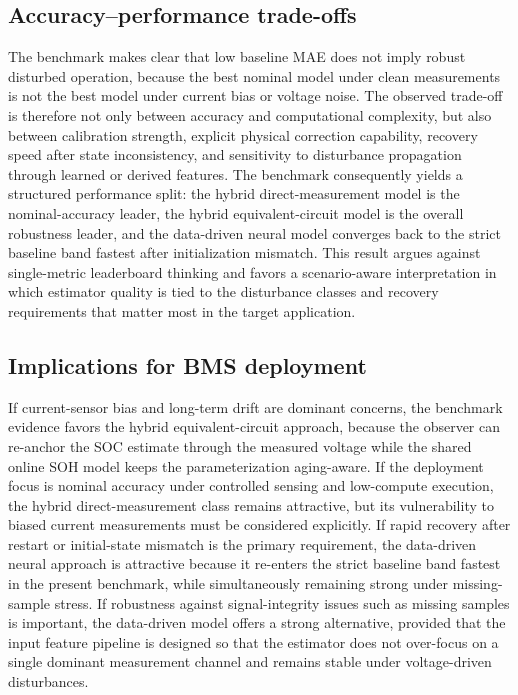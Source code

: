 \documentclass[review,nopreprintline]{elsarticle}
\begin{document}
\subsection{Accuracy--performance trade-offs}
The benchmark makes clear that low baseline MAE does not imply robust disturbed operation, because the best nominal model under clean measurements is not the best model under current bias or voltage noise. The observed trade-off is therefore not only between accuracy and computational complexity, but also between calibration strength, explicit physical correction capability, recovery speed after state inconsistency, and sensitivity to disturbance propagation through learned or derived features. The benchmark consequently yields a structured performance split: the hybrid direct-measurement model is the nominal-accuracy leader, the hybrid equivalent-circuit model is the overall robustness leader, and the data-driven neural model converges back to the strict baseline band fastest after initialization mismatch. This result argues against single-metric leaderboard thinking and favors a scenario-aware interpretation in which estimator quality is tied to the disturbance classes and recovery requirements that matter most in the target application.

\subsection{Implications for BMS deployment}
If current-sensor bias and long-term drift are dominant concerns, the benchmark evidence favors the hybrid equivalent-circuit approach, because the observer can re-anchor the SOC estimate through the measured voltage while the shared online SOH model keeps the parameterization aging-aware. If the deployment focus is nominal accuracy under controlled sensing and low-compute execution, the hybrid direct-measurement class remains attractive, but its vulnerability to biased current measurements must be considered explicitly. If rapid recovery after restart or initial-state mismatch is the primary requirement, the data-driven neural approach is attractive because it re-enters the strict baseline band fastest in the present benchmark, while simultaneously remaining strong under missing-sample stress. If robustness against signal-integrity issues such as missing samples is important, the data-driven model offers a strong alternative, provided that the input feature pipeline is designed so that the estimator does not over-focus on a single dominant measurement channel and remains stable under voltage-driven disturbances.
\end{document}
